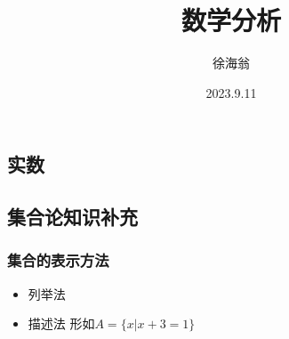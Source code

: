 \documentclass[11pt,hyperref,a4paper,UTF8]{ctexart}
\title{数学分析}
\author{徐海翁}
\date{2023.9.11}
\begin{document}
\begin{CJK}{UTF8}{gkai}
\maketitle

\tableofcontents











\section{实数}
\subsection{集合论知识补充}
\subsubsection{集合的表示方法}

\begin{itemize}
  \item 列举法
  \item 描述法
  形如$A=\{x|x+3=1\}$\\
\end{itemize}


\end{CJK}
\end{document}
